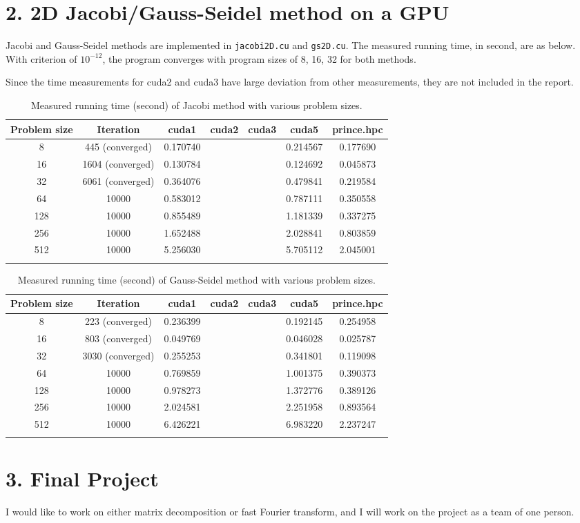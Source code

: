 \documentclass[amsmath,amssymb]{revtex4}
\begin{document}
\section{\label{sec:sec2}2. 2D Jacobi/Gauss-Seidel method on a GPU}
Jacobi and Gauss-Seidel methods are implemented in {\tt jacobi2D.cu} and {\tt gs2D.cu}. The measured running time, in second, are as below. With criterion of $10^{-12}$, the program converges with program sizes of 8, 16, 32 for both methods.

Since the time measurements for cuda2 and cuda3 have large deviation from other measurements, they are not included in the report.

\begin{longtable}{c | c | c | c | c | c | c}
    \hline 
Problem size & Iteration & cuda1 & cuda2 & cuda3 & cuda5 & prince.hpc \\ \hline \hline
8 &445 (converged)&0.170740&  &	 & 0.214567  & 0.177690 \\\hline
16 &1604 (converged)&0.130784&  &	 & 0.124692  & 0.045873 \\\hline
32 &6061 (converged)&0.364076&  &	 & 0.479841  & 0.219584 \\\hline
64 &10000&0.583012&  &	 & 0.787111  & 0.350558 \\\hline
128 &10000&0.855489&  &	 & 1.181339  & 0.337275 \\\hline
256 &10000&1.652488&  & & 2.028841  & 0.803859 \\\hline
512 &10000&5.256030&  &	 & 5.705112  & 2.045001 \\\hline
\caption{Measured running time (second) of Jacobi method with various problem sizes.}
\end{longtable}

\begin{longtable}{c | c | c | c | c | c | c}
    \hline 
Problem size& Iteration & cuda1 & cuda2 & cuda3 & cuda5 & prince.hpc \\ \hline \hline
8 &223 (converged)&0.236399&  &	 & 0.192145  &0.254958 \\\hline
16 &803 (converged)&0.049769&  &	 & 0.046028  & 0.025787 \\\hline
32 &3030 (converged)&0.255253&  &	 & 0.341801  & 0.119098 \\\hline
64 &10000&0.769859&  &	 & 1.001375  & 0.390373 \\\hline
128 &10000&0.978273&  &	 & 1.372776  & 0.389126 \\\hline
256 &10000&2.024581&  &	 & 2.251958  & 0.893564 \\\hline
512 &10000&6.426221&  & & 6.983220  & 2.237247 \\\hline
\caption{Measured running time (second) of Gauss-Seidel method with various problem sizes.}
\end{longtable}

\section{\label{sec:sec3}3. Final Project}
I would like to work on either matrix decomposition or fast Fourier transform, and I will work on the project as a team of one person.
\end{document}
